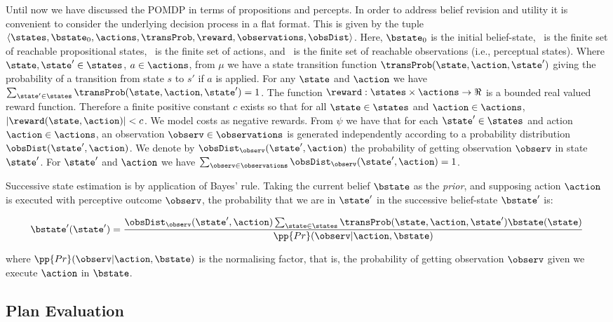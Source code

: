 Until now we have discussed the POMDP in terms of propositions and
percepts. In order to address belief revision and utility it is
convenient to consider the underlying decision process in a flat
format. This is given by the tuple
$\langle \states, \bstate_0, \actions, \transProb, \reward,
\observations, \obsDist \rangle$. Here, $\bstate_0$ is the initial
belief-state, \states\ is the finite set of reachable propositional
states, \actions\ is the finite set of actions, and \observations\ is
the finite set of reachable observations (i.e., perceptual states).
Where $\state, \state' \in \states$, $a \in \actions$, from $\mu$ we
have a state transition function $\transProb(\state, \action,
\state')$ giving the probability of a transition from state $s$ to
$s'$ if $a$ is applied. For any $\state$ and $\action$ we have
$\sum_{\state' \in \states} \transProb(\state, \action, \state') = 1$.
The function $\reward:\states \times \actions \to \Re$ is a bounded real
valued reward function. Therefore a finite positive constant $c$
exists so that for all $\state \in \states$ and $\action \in
\actions$, $|\reward(\state, \action)| < c$. We model costs as
negative rewards.
From $\psi$ we have that for each $\state' \in \states$ and action
$\action \in \actions$, an observation $\observ \in \observations$ is
generated independently according to a probability distribution
$\obsDist(\state', \action)$. We denote by $\obsDist_\observ(\state',
\action)$ the probability of getting observation $\observ$ in state
$\state'$. For $\state'$ and $\action$ we have $\sum_{\observ \in
\observations} \obsDist_\observ(\state', \action) = 1$.

Successive state estimation is by application of Bayes'
rule.  Taking the current belief $\bstate$ as the {\em prior}, and
supposing action $\action$ is executed with perceptive outcome
$\observ$, the probability that we are in $\state'$ in the
successive belief-state $\bstate'$ is:

\begin{equation}\label{eq:revision}
\bstate'(\state') = \frac{\obsDist_\observ(\state', \action)
  \sum_{\state\in \states} \transProb(\state, \action, \state') \bstate(\state) }{\pp{Pr}(\observ | \action, \bstate)}
\end{equation}

\noindent where $\pp{Pr}(\observ | \action, \bstate)$ is the
normalising factor, that is, the probability of getting observation
$\observ$ given we execute $\action$ in $\bstate$.

\subsection{Plan Evaluation}

